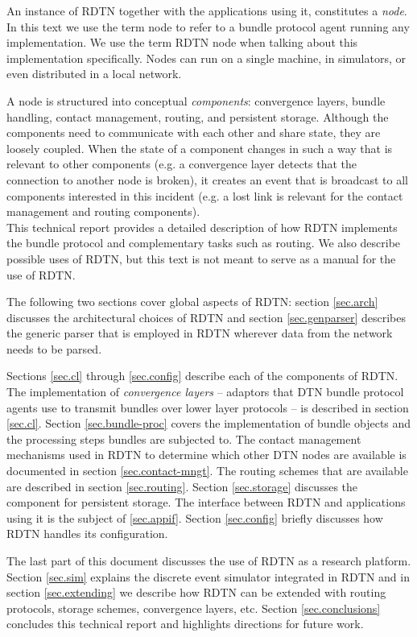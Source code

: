 \documentclass[a4paper]{article}
\begin{document}
An instance of RDTN together with the applications using it, constitutes a {\em
node}. In this text we use the term node to refer to a bundle protocol agent
running any implementation. We use the term RDTN node when talking about this
implementation specifically. Nodes can run on a single machine, in simulators,
or even distributed in a local network.

A node is structured into conceptual {\em components}: convergence layers,
bundle handling, contact management, routing, and persistent storage.  Although
the components need to communicate with each other and share state, they are
loosely coupled. When the state of a component changes in such a way that is
relevant to other components (e.g. a convergence layer detects that the
connection to another node is broken), it creates an event that is
broadcast to all components interested in this incident (e.g. a lost link is
relevant for the contact management and routing components).\\

This technical report provides a detailed description of how RDTN implements the
bundle protocol and complementary tasks such as routing. We also describe
possible uses of RDTN, but this text is not meant to serve as a manual for the
use of RDTN.

The following two sections cover global aspects of RDTN: section \ref{sec.arch}
discusses the architectural choices of RDTN and section \ref{sec.genparser}
describes the generic parser that is employed in RDTN wherever data from the
network needs to be parsed.

Sections \ref{sec.cl} through \ref{sec.config} describe each of the components
of RDTN.  The implementation of {\em convergence layers} -- adaptors that DTN
bundle protocol agents use to transmit bundles over lower layer protocols -- is
described in section \ref{sec.cl}. Section \ref{sec.bundle-proc} covers the
implementation of bundle objects and the processing steps bundles are subjected
to. The contact management mechanisms used in RDTN to determine which other DTN
nodes are available is documented in section \ref{sec.contact-mngt}. The routing
schemes that are available are
described in section \ref{sec.routing}. Section \ref{sec.storage} discusses the
component for persistent storage. The interface between RDTN and applications
using it is the subject of \ref{sec.appif}. Section \ref{sec.config} briefly
discusses how RDTN handles its configuration.

The last part of this document discusses the use of RDTN as a research platform.
Section \ref{sec.sim} explains the discrete event simulator integrated in RDTN
and in section \ref{sec.extending} we describe how RDTN can be extended with
routing protocols, storage schemes, convergence layers, etc. Section
\ref{sec.conclusions} concludes this technical report and highlights directions
for future work.
\end{document}
